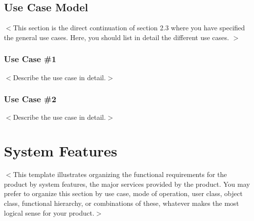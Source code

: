 \documentclass[a4paper, 11pt]{scrreprt}
\begin{document}

\section{Use Case Model}
$<$This section is the direct continuation of section 2.3 where you have specified 
the general use cases. Here, you should list in detail the different use cases. 
$>$
\subsection{Use Case \#1}
$<$Describe the use case in detail.$>$

\subsection{Use Case \#2}
$<$Describe the use case in detail.$>$



\chapter{System Features}
$<$This template illustrates organizing the functional requirements for the 
product by system features, the major services provided by the product. You may 
prefer to organize this section by use case, mode of operation, user class, 
object class, functional hierarchy, or combinations of these, whatever makes the 
most logical sense for your product.$>$
\end{document}
